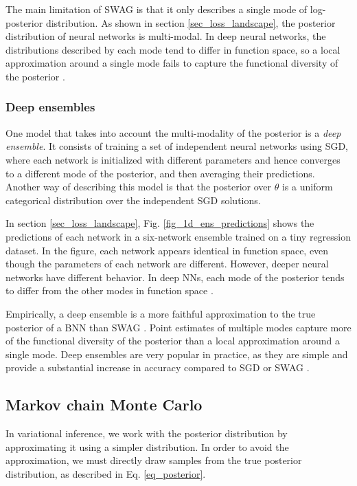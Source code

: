 \documentclass[12pt]{article}
\begin{document}
The main limitation of SWAG is that it only describes a single mode of log-posterior distribution. As shown in section \ref{sec_loss_landscape}, the posterior distribution of neural networks is multi-modal. In deep neural networks, the distributions described by each mode tend to differ in function space, so a local approximation around a single mode fails to capture the functional diversity of the posterior \cite{deep_ens}.

\subsubsection{Deep ensembles}

One model that takes into account the multi-modality of the posterior is a \textit{deep ensemble}. It consists of training a set of independent neural networks using SGD, where each network is initialized with different parameters and hence converges to a different mode of the posterior, and then averaging their predictions. Another way of describing this model is that the posterior over $\theta$ is a uniform categorical distribution over the independent SGD solutions.

In section \ref{sec_loss_landscape}, Fig. \ref{fig_1d_ens_predictions} shows the predictions of each network in a six-network ensemble trained on a tiny regression dataset. In the figure, each network appears identical in function space, even though the parameters of each network are different. However, deeper neural networks have different behavior. In deep NNs, each mode of the posterior tends to differ from the other modes in function space \cite{deep_ens}.

Empirically, a deep ensemble is a more faithful approximation to the true posterior of a BNN than SWAG \cite{bnn_posterior}. Point estimates of multiple modes capture more of the functional diversity of the posterior than a local approximation around a single mode. Deep ensembles are very popular in practice, as they are simple and provide a substantial increase in accuracy compared to SGD or SWAG \cite{multiswag}.

\subsection{Markov chain Monte Carlo}
\label{sec_mcmc}

In variational inference, we work with the posterior distribution by approximating it using a simpler distribution. In order to avoid the approximation, we must directly draw samples from the true posterior distribution, as described in Eq. \ref{eq_posterior}.
\end{document}
